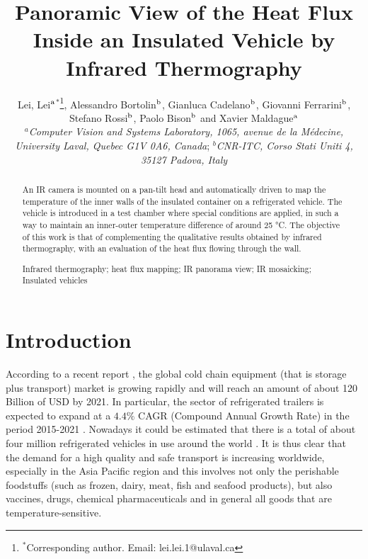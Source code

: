 \documentclass{tQRT2e}
\begin{document}


\title{Panoramic View of the Heat Flux Inside an Insulated Vehicle by Infrared Thermography}

\author{Lei, Lei$^{\rm a}$$^{\ast}$\thanks{$^\ast$Corresponding author. Email: lei.lei.1@ulaval.ca
		\vspace{6pt}},  Alessandro Bortolin$^{\rm b}$, Gianluca Cadelano$^{\rm b}$, Giovanni Ferrarini$^{\rm b}$, Stefano Rossi$^{\rm b}$, Paolo Bison$^{\rm b}$ and Xavier Maldague$^{\rm a}$ \\\vspace{6pt}  $^{a}${\em{Computer Vision and Systems Laboratory, 1065, avenue de la Médecine, University Laval, Quebec G1V 0A6, Canada}};
	$^{b}${\em{CNR-ITC, Corso Stati Uniti 4, 35127 Padova, Italy}} \\\received{} }

\maketitle

\begin{abstract}
	An IR camera is mounted on a pan-tilt head and automatically driven to map the temperature of the inner walls of the insulated container on a refrigerated vehicle. The vehicle is introduced in a test chamber where special conditions are applied, in such a way to maintain an inner-outer temperature difference of around 25 °C. The objective of this work is that of complementing the qualitative results obtained by infrared thermography, with an evaluation of the heat flux flowing through the wall.
	
\begin{keywords} Infrared thermography; heat flux mapping; IR panorama view; IR mosaicking; Insulated vehicles 
\end{keywords}
\end{abstract}

%
%
\section{Introduction}
According to a recent report \cite{Zion2016}, the global cold chain equipment (that is storage plus transport) market is growing rapidly and will reach an amount of about 120 Billion of USD by 2021. In particular, the sector of refrigerated trailers is expected to expand at a $ 4.4\% $ CAGR (Compound Annual Growth Rate) in the period 2015-2021 \cite{RM2015}. Nowadays it could be estimated that there is a total of about four million refrigerated vehicles in use around the world \cite{UNEP2010}. It is thus clear that the demand for a high quality and safe transport is increasing worldwide, especially in the Asia Pacific region and this involves not only the perishable foodstuffs (such as frozen, dairy, meat, fish and seafood products), but also vaccines, drugs, chemical pharmaceuticals and in general all goods that are temperature-sensitive. 
\end{document}
